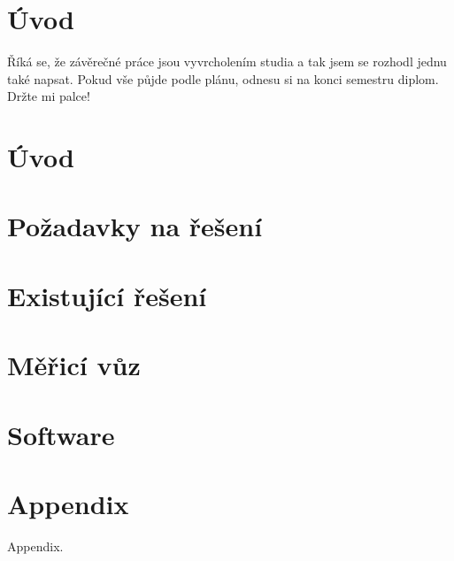 \documentclass[digital, oneside, notable, nolot, nolof]{fithesis3}
\begin{document}
\chapter*{Úvod}

Říká se, že závěrečné práce jsou vyvrcholením studia a tak jsem se
rozhodl jednu také napsat. Pokud vše půjde podle plánu, odnesu si
na konci semestru diplom. Držte mi palce!

\chapter{Úvod} \label{chap:uvod}


\chapter{Požadavky na řešení} \label{chap:pozadavky}


\chapter{Existující řešení} \label{chap:prehled}


\chapter{Měřicí vůz} \label{chap:merici-vuz}


\chapter{Software} \label{chap:sw}


\printbibliography[heading=bibintoc]

\appendix
\chapter{Appendix}
Appendix.
\end{document}
